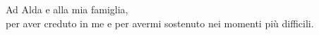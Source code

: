 \newpage\null\thispagestyle{empty}\newpage%

\newenvironment{dedication}
  {\clearpage           %
   \thispagestyle{empty}%
   \vspace*{\stretch{1}}%
   \itshape             %
   \raggedleft          %
  }
  {\par %
   \vspace{\stretch{3}} %
   \clearpage           %
  }

\begin{dedication}
Ad Alda e alla mia famiglia, \\per aver creduto in me e per avermi sostenuto nei momenti più difficili.
\end{dedication}